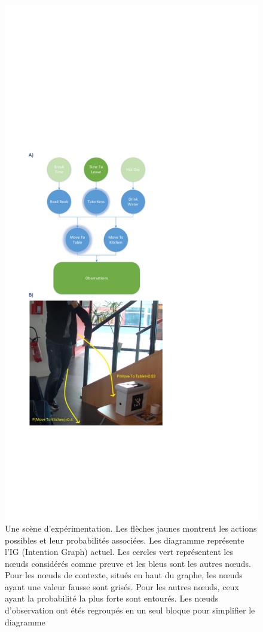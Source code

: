 \documentclass[a4paper,11pt,twoside]{StyleThese}
\begin{document}
 \begin{figure}[h!]
	\centering
	\includegraphics[trim={2cm 11cm 11cm 17cm},clip,scale=0.56]{img/cookieScenario.pdf}
	\caption{Une scène d'expérimentation. Les flèches jaunes montrent les actions possibles et leur probabilités associées. Les diagramme représente l'IG (Intention Graph) actuel. Les cercles vert représentent les nœuds considérés comme preuve et les bleus sont les autres nœuds. Pour les nœuds de contexte, situés en haut du graphe, les nœuds ayant une valeur fausse sont grisés. Pour les autres nœuds, ceux ayant la probabilité la plus forte sont entourés. Les nœuds d'observation ont étés regroupés en un seul bloque pour simplifier le diagramme}
	\label{fig:intention_graph}
   	\vspace{-20pt}
\end{figure}
\end{document}
